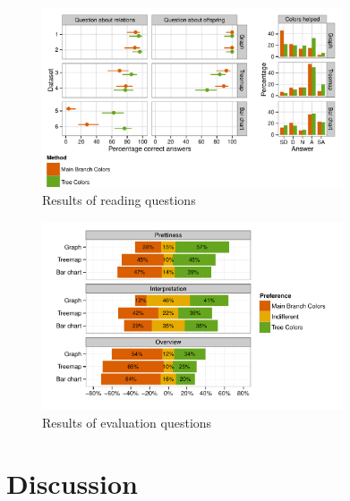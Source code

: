 \documentclass[journal]{vgtc}                %
\begin{document}
\begin{figure}[tb]
  \centering
	\includegraphics[width=3.5in]{user_study_results_mod2.pdf}
  \caption{Results of reading questions}\label{fig:user1}
\end{figure}


\begin{figure}[tb]
  \centering
	\includegraphics[width=3.5in]{user_study_results2.pdf}
  \caption{Results of evaluation questions}\label{fig:user2}
\end{figure}

\section{Discussion}~\label{secdisc}






\end{document}
